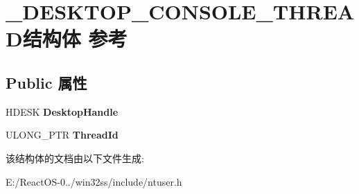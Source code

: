 \hypertarget{struct___d_e_s_k_t_o_p___c_o_n_s_o_l_e___t_h_r_e_a_d}{}\section{\+\_\+\+D\+E\+S\+K\+T\+O\+P\+\_\+\+C\+O\+N\+S\+O\+L\+E\+\_\+\+T\+H\+R\+E\+A\+D结构体 参考}
\label{struct___d_e_s_k_t_o_p___c_o_n_s_o_l_e___t_h_r_e_a_d}
\subsection*{Public 属性}
\begin{DoxyCompactItemize}
\item 
\mbox{\label{struct___d_e_s_k_t_o_p___c_o_n_s_o_l_e___t_h_r_e_a_d_a7581628761455d15087619229f384b2a}} 
H\+D\+E\+SK {\bfseries Desktop\+Handle}
\item 
\mbox{\label{struct___d_e_s_k_t_o_p___c_o_n_s_o_l_e___t_h_r_e_a_d_a77ebc30f39c7fbfc3c9441f1c0db7d31}} 
U\+L\+O\+N\+G\+\_\+\+P\+TR {\bfseries Thread\+Id}
\end{DoxyCompactItemize}


该结构体的文档由以下文件生成\+:\begin{DoxyCompactItemize}
\item 
E\+:/\+React\+O\+S-\/0../win32ss/include/ntuser.\+h\end{DoxyCompactItemize}
